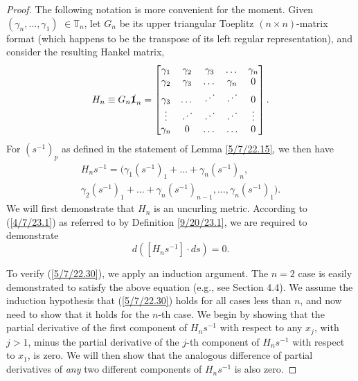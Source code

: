 \documentclass{amsart}
\numberwithin{equation}{section}
\theoremstyle{definition}
\numberwithin{theorem}{section}
\begin{document}
\begin{proof} The following notation is more convenient for the moment.  Given $(\gamma_n,\dots,\gamma_1)$ $\in \mathbb{T}_n$, let $G_n$ be its upper triangular Toeplitz $(n\times n)$-matrix format (which happens to be the transpose of its left regular representation), and consider the resulting Hankel matrix, \enlargethispage{1cm}
\begin{equation}\label{5/7/22.20} H_n \equiv G_n \slashed{\bf 1}_n = \begin{bmatrix} \gamma_1 & \gamma_2 & \gamma_3 & \dots & \gamma_n \\ \gamma_2 & \gamma_3 & \dots & \gamma_n & 0 \\ \gamma_3 & \dots & \iddots & \iddots & 0  \\ \vdots & \iddots & \iddots & \iddots & \vdots \\ \gamma_n & 0 & \dots & \ldots & 0 \end{bmatrix}.\end{equation}
For $\left( s^{-1} \right)_p$ as defined in the statement of Lemma \ref{5/7/22.15}, we then have
\begin{multline}  H_n s^{-1}   =  \Big( \gamma_1\left( s^{-1} \right)_1  + \dots + \gamma_n \left( s^{-1} \right)_n, \\ \gamma_2\left( s^{-1} \right)_1  + \dots + \gamma_n \left( s^{-1} \right)_{n-1}, 
  \dots , 
 \gamma_n \left( s^{-1} \right)_1 \Big). \label{5/7/22.40}
\end{multline}
 We will first demonstrate that $H_n$ is an uncurling metric.  According to (\ref{4/7/23.1}) as referred to by Definition \ref{9/20/23.1}, we are required to demonstrate 
\begin{equation}\label{5/7/22.30} d\left([H_n s^{-1}]\cdot ds\right) = 0.\end{equation}  

To verify (\ref{5/7/22.30}), we apply an induction argument.  The $n=2$ case is easily demonstrated to satisfy the above equation (e.g., see Section 4.4).  We assume the induction hypothesis that (\ref{5/7/22.30}) holds for all cases less than $n$, and now need to show that it holds for the $n$-th case.  
We begin by showing that the partial derivative of the first component of $H_n s^{-1}$ with respect to any $x_j$, with $j>1$, minus the partial derivative of the $j$-th component of $H_n s^{-1}$ with respect to $x_1$, is zero. We will then show that the analogous difference of partial derivatives of {\it any} two different components of $H_ns^{-1}$ is also zero.


\end{proof}
\end{document}
